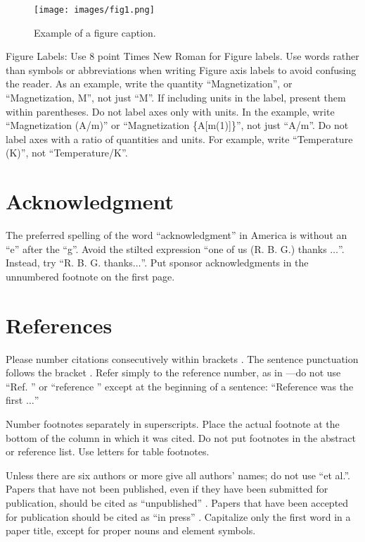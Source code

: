 \documentclass[conference]{IEEEtran}
\begin{document}
\begin{figure}[htbp]
\centerline{
    \texttt{[image: images/fig1.png]}
    }
\caption{Example of a figure caption.}
\label{fig}
\end{figure}

Figure Labels: Use 8 point Times New Roman for Figure labels. Use words 
rather than symbols or abbreviations when writing Figure axis labels to 
avoid confusing the reader. As an example, write the quantity 
``Magnetization'', or ``Magnetization, M'', not just ``M''. If including 
units in the label, present them within parentheses. Do not label axes only 
with units. In the example, write ``Magnetization (A/m)'' or ``Magnetization 
\{A[m(1)]\}'', not just ``A/m''. Do not label axes with a ratio of 
quantities and units. For example, write ``Temperature (K)'', not 
``Temperature/K''.


\section*{Acknowledgment}

The preferred spelling of the word ``acknowledgment'' in America is without an ``e'' after the ``g''. Avoid the stilted expression ``one of us (R. B. G.) thanks $\ldots$''. Instead, try ``R. B. G. thanks$\ldots$''. Put sponsor acknowledgments in the unnumbered footnote on the first page.

\section*{References}

Please number citations consecutively within brackets \cite{eason1955certain}.
The sentence punctuation follows the bracket \cite{clerk1892maxwell}. Refer simply to the reference number, as in \cite{jacobs1963fine}---do not use ``Ref. \cite{jacobs1963fine}'' or ``reference \cite{jacobs1963fine}'' except at 
the beginning of a sentence: ``Reference \cite{jacobs1963fine} was the first $\ldots$''

Number footnotes separately in superscripts. Place the actual footnote at 
the bottom of the column in which it was cited. Do not put footnotes in the 
abstract or reference list. Use letters for table footnotes.

Unless there are six authors or more give all authors' names; do not use 
``et al.''. Papers that have not been published, even if they have been 
submitted for publication, should be cited as ``unpublished'' \cite{nicoletitle}. Papers 
that have been accepted for publication should be cited as ``in press'' \cite{elissatitle}. 
Capitalize only the first word in a paper title, except for proper nouns and 
element symbols.
\end{document}
